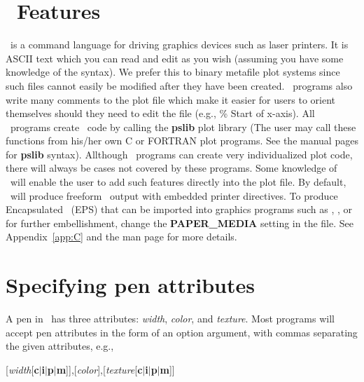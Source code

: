 \section{\PS\ Features}
\PS\ is a command language for driving graphics
devices such as laser printers.  It is ASCII text which you
can read and edit as you wish (assuming you have some knowledge
of the syntax).  We prefer this to binary metafile plot
systems since such files cannot easily be modified after they
have been created.  \GMT\ programs also write many comments to
the plot file which make it easier for users to orient
themselves should they need to edit the file (e.g., \% Start
of x-axis).  All \GMT\ programs create \PS\ code by
calling the \textbf{pslib} plot library (The user may call these
functions from his/her own C or FORTRAN plot programs. See the
manual pages for \textbf{pslib} syntax).  Allthough \GMT\ programs
can create very individualized plot code, there will always be
cases not covered by these programs.  Some knowledge of
\PS\ will enable the user to add such features
directly into the plot file.  By default, \GMT\ will produce
freeform \PS\ output with embedded printer directives.  To
produce Encapsulated \PS\ (EPS) that can be imported into graphics programs such as
, ,  or  for further
embellishment, change the \textbf{PAPER\_MEDIA} setting in the 
file.  See Appendix~\ref{app:C} and the  man page for more details.

\section{Specifying pen attributes}

%
%
\label{sec:pen}
A pen in \GMT\ has three attributes: \emph{width}, \emph{color},
and \emph{texture}.  Most programs will accept pen attributes in
the form of an option argument, with commas separating the
given attributes, e.g.,

\vspace{\baselineskip} 

\par {}[\emph{width}[\textbf{c$|$i$|$p$|$m}]],[\emph{color}],[\emph{texture}[\textbf{c$|$i$|$p$|$m}]]\par 

